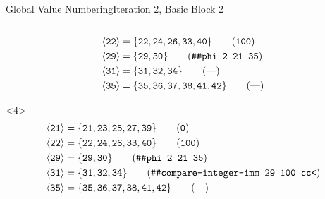 \documentclass{beamer}
\newcommand{\vn}[1]{\ensuremath{\langle\texttt{#1}\rangle}}
\newcommand{\vreg}[1]{\texttt{#1}}
\begin{document}
\begin{frame}[fragile]{Global Value Numbering}{Iteration 2, Basic Block 2}
\begin{columns}[t,onlytextwidth]
\begin{column}{.5\textwidth}
\begin{onlyenv}
\begin{align*}
          \vn{22} &= \{\vreg{22},
                       \vreg{24},
                       \vreg{26},
                       \vreg{33},
                       \vreg{40}\} \tag{\texttt{100}} \\
          \vn{29} &= \{\vreg{29},
                       \vreg{30}\} \tag{\texttt{\#\#phi 2 21 35}} \\
          \vn{31} &= \{\vreg{31},
                       \vreg{32},
                       \vreg{34}\} \tag{---} \\
          \vn{35} &= \{\vreg{35},
                       \vreg{36},
                       \vreg{37},
                       \vreg{38},
                       \vreg{41},
                       \vreg{42}\} \tag{---}
        \end{align*}
      \end{onlyenv}
      \begin{onlyenv}<4>
        \begin{align*}
          \vn{21} &= \{\vreg{21},
                       \vreg{23},
                       \vreg{25},
                       \vreg{27},
                       \vreg{39}\} \tag{\texttt{0}} \\
          \vn{22} &= \{\vreg{22},
                       \vreg{24},
                       \vreg{26},
                       \vreg{33},
                       \vreg{40}\} \tag{\texttt{100}} \\
          \vn{29} &= \{\vreg{29},
                       \vreg{30}\} \tag{\texttt{\#\#phi 2 21 35}} \\
          \vn{31} &= \{\vreg{31},
                       \vreg{32},
                       \vreg{34}\} \tag{\texttt{\#\#compare-integer-imm 29 100 cc<}} \\
          \vn{35} &= \{\vreg{35},
                       \vreg{36},
                       \vreg{37},
                       \vreg{38},
                       \vreg{41},
                       \vreg{42}\} \tag{---}
        \end{align*}
      \end{onlyenv}
    \end{column}
  \end{columns}
\end{frame}
\end{document}

